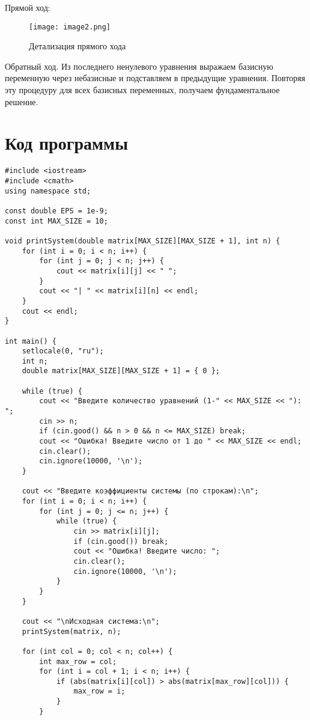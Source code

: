 \documentclass[a4paper,12pt]{article}
\begin{document}
Прямой ход:

\begin{figure}[H]
\centering
\texttt{[image: image2.png]}
\caption{Детализация прямого хода}
\end{figure}

Обратный ход. Из последнего ненулевого уравнения выражаем базисную переменную через небазисные и подставляем в предыдущие уравнения. Повторяя эту процедуру для всех базисных переменных, получаем фундаментальное решение.

\section{Код программы}
\begin{verbatim}
#include <iostream>
#include <cmath>
using namespace std;

const double EPS = 1e-9;
const int MAX_SIZE = 10;

void printSystem(double matrix[MAX_SIZE][MAX_SIZE + 1], int n) {
    for (int i = 0; i < n; i++) {
        for (int j = 0; j < n; j++) {
            cout << matrix[i][j] << " ";
        }
        cout << "| " << matrix[i][n] << endl;
    }
    cout << endl;
}

int main() {
    setlocale(0, "ru");
    int n;
    double matrix[MAX_SIZE][MAX_SIZE + 1] = { 0 };
    
    while (true) {
        cout << "Введите количество уравнений (1-" << MAX_SIZE << "): ";
        cin >> n;
        if (cin.good() && n > 0 && n <= MAX_SIZE) break;
        cout << "Ошибка! Введите число от 1 до " << MAX_SIZE << endl;
        cin.clear();
        cin.ignore(10000, '\n');
    }
    
    cout << "Введите коэффициенты системы (по строкам):\n";
    for (int i = 0; i < n; i++) {
        for (int j = 0; j <= n; j++) {
            while (true) {
                cin >> matrix[i][j];
                if (cin.good()) break;
                cout << "Ошибка! Введите число: ";
                cin.clear();
                cin.ignore(10000, '\n');
            }
        }
    }
    
    cout << "\nИсходная система:\n";
    printSystem(matrix, n);
    
    for (int col = 0; col < n; col++) {
        int max_row = col;
        for (int i = col + 1; i < n; i++) {
            if (abs(matrix[i][col]) > abs(matrix[max_row][col])) {
                max_row = i;
            }
        }
        

\end{verbatim}
\end{document}
